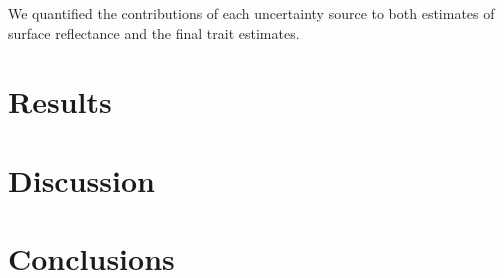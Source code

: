 \documentclass[draft]{agujournal2019}
\begin{document}
We quantified the contributions of each uncertainty source to both estimates of surface reflectance and the final trait estimates.

\section{Results}\label{sec:results}

\section{Discussion}\label{sec:discussion}

\section{Conclusions}





%
%
%
%
%
%
%
%
%
%
\end{document}
